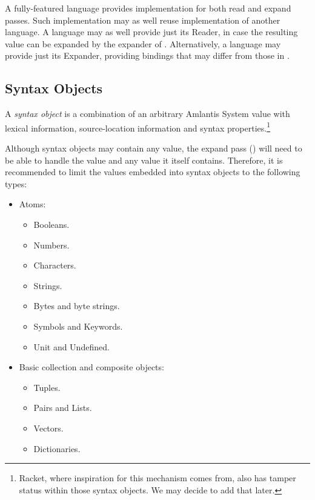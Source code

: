 A fully-featured language provides implementation for both read and expand passes. Such implementation may as well reuse implementation of another language. A language may as well provide just its Reader, in case the resulting value can be expanded by the expander of \AmlBase. Alternatively, a language may provide just its Expander, providing bindings that may differ from those in \AmlBase.





\subsection{Syntax Objects}
\label{subsec:environment-language-syntax-objects}

A {\em syntax object} is a combination of an arbitrary Amlantis System value with lexical information, source-location information and syntax properties.\footnote{Racket, where inspiration for this mechanism comes from, also has tamper status within those syntax objects. We may decide to add that later.}

Although syntax objects may contain any value, the expand pass () will need to be able to handle the value and any value it itself contains. Therefore, it is recommended to limit the values embedded into syntax objects to the following types:

\begin{itemize}
  \item Atoms:
  \begin{itemize}
    \item Booleans.
    \item Numbers.
    \item Characters.
    \item Strings.
    \item Bytes and byte strings.
    \item Symbols and Keywords.
    \item Unit and Undefined.
  \end{itemize}
  \item Basic collection and composite objects:
  \begin{itemize}
    \item Tuples.
    \item Pairs and Lists.
    \item Vectors.
    \item Dictionaries.
  \end{itemize}
\end{itemize}




